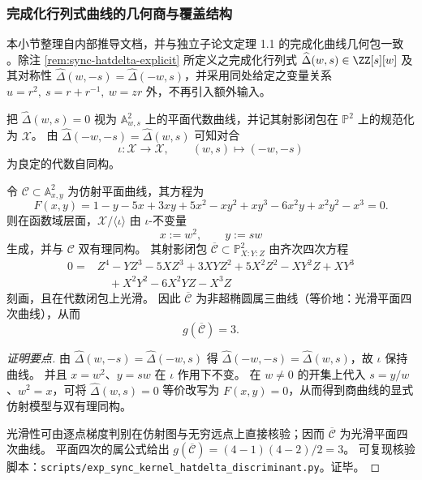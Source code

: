 \subsubsection{完成化行列式曲线的几何商与覆盖结构}\label{subsubsec:sync-kernel-hatdelta-curve-geometry}
本小节整理自内部推导文档，并与独立子论文定理 1.1 的完成化曲线几何包一致
\cite{Internal2026SelfDualSynchronisationKernelCyclotomicTwists}。除注 \ref{rem:sync-hatdelta-explicit} 所定义之完成化行列式
\(\widehat{\Delta}(w,s)\in\ZZ[s][w]\) 及其对称性
\(\widehat\Delta(w,-s)=\widehat\Delta(-w,s)\)，并采用同处给定之变量关系
\(
u=r^2,\ s=r+r^{-1},\ w=zr
\)
外，不再引入额外输入。
\par
把 \(\widehat\Delta(w,s)=0\) 视为 \(\mathbb{A}^2_{w,s}\) 上的平面代数曲线，并记其射影闭包在 \(\mathbb{P}^2\) 上的规范化为 \(\mathcal{X}\)。
由
\(
\widehat\Delta(-w,-s)=\widehat\Delta(w,s)
\)
可知对合
\[
\iota:\mathcal{X}\longrightarrow\mathcal{X},\qquad (w,s)\longmapsto(-w,-s)
\]
为良定的代数自同构。

\begin{proposition}\label{prop:sync-hatdelta-curve-quotient-plane-quartic-genus3}
令 \(\mathcal{C}\subset\mathbb{A}^2_{x,y}\) 为仿射平面曲线，其方程为
\[
F(x,y)=1-y-5x+3xy+5x^2-xy^2+xy^3-6x^2y+x^2y^2-x^3=0.
\]
则在函数域层面，\(\mathcal{X}/\langle\iota\rangle\) 由 \(\iota\)-不变量
\[
x:=w^2,\qquad y:=sw
\]
生成，并与 \(\mathcal{C}\) 双有理同构。
其射影闭包 \(\overline{\mathcal{C}}\subset\mathbb{P}^2_{X:Y:Z}\) 由齐次四次方程
\[
\begin{aligned}
0={}&Z^4-YZ^3-5XZ^3+3XYZ^2+5X^2Z^2-XY^2Z+XY^3\\
&\quad +X^2Y^2-6X^2YZ-X^3Z
\end{aligned}
\]
刻画，且在代数闭包上光滑。
因此 \(\overline{\mathcal{C}}\) 为非超椭圆属三曲线（等价地：光滑平面四次曲线），从而
\[
g(\overline{\mathcal{C}})=3.
\]
\end{proposition}
\begin{proof}[证明要点]
由 \(\widehat\Delta(w,-s)=\widehat\Delta(-w,s)\) 得 \(\widehat\Delta(-w,-s)=\widehat\Delta(w,s)\)，故 \(\iota\) 保持曲线。
并且 \(x=w^2\)、\(y=sw\) 在 \(\iota\) 作用下不变。
在 \(w\neq 0\) 的开集上代入 \(s=y/w\)、\(w^2=x\)，可将 \(\widehat\Delta(w,s)=0\) 等价改写为 \(F(x,y)=0\)，从而得到商曲线的显式仿射模型与双有理同构。
\par
光滑性可由逐点梯度判别在仿射图与无穷远点上直接核验；因而 \(\overline{\mathcal{C}}\) 为光滑平面四次曲线。
平面四次的属公式给出 \(g(\overline{\mathcal{C}})=(4-1)(4-2)/2=3\)。
可复现核验脚本：\texttt{scripts/exp\_sync\_kernel\_hatdelta\_discriminant.py}。证毕。
\end{proof}

